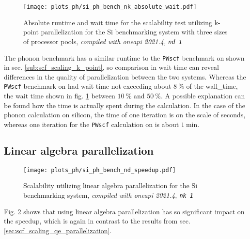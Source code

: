 \documentclass[main.tex]{subfiles}
\begin{document}

\begin{figure}[htb!]
    \centering
    \texttt{[image: plots\_ph/si\_ph\_bench\_nk\_absolute\_wait.pdf]}
    \caption{Absolute runtime and wait time for the scalability test utilizing k-point parallelization for the Si benchmarking system with three sizes of processor pools, \emph{\QE compiled with \gls{oneapi} 2021.4, \texttt{nd 1}}}
    \label{fig:scaling_ph_nk_si_absolute_wait}
\end{figure}


The phonon benchmark has a similar runtime to the \texttt{PWscf} benchmark on \TaS shown in sec. \ref{sub:scf_scaling_k_point}, so comparison in wait time can reveal differences in the quality of parallelization between the two systems.
Whereas the \texttt{PWscf} benchmark on \TaS had wait time not exceeding about \(\SI{8}{\percent}\) of the \gls{wall_time}, the wait time shown in fig. \ref{fig:scaling_ph_nk_si_absolute_wait} between \(\SI{10}{\percent}\) and \(\SI{50}{\percent}\).
A possible explanation can be found how the time is actually spent during the calculation.
In the case of the phonon calculation on silicon, the time of one iteration is on the scale of seconds, whereas one iteration for the \texttt{PWscf} calculation on \TaS is about \(\SI{1}{\minute}\).

\subsection{Linear algebra parallelization}

\begin{figure}[htb!]
    \centering
    \texttt{[image: plots\_ph/si\_ph\_bench\_nd\_speedup.pdf]}
    \caption{Scalability utilizing linear algebra parallelization for the Si benchmarking system, \emph{\QE compiled with \gls{oneapi} 2021.4, \texttt{nk 1}}}
    \label{fig:scaling_ph_nd_si}
\end{figure}
Fig. \ref{fig:scaling_ph_nd_si} shows that using linear algebra parallelization has so significant impact on the speedup, which is again in contrast to the results from sec. \ref{sec:scf_scaling_qe_parallelization}.
\end{document}
